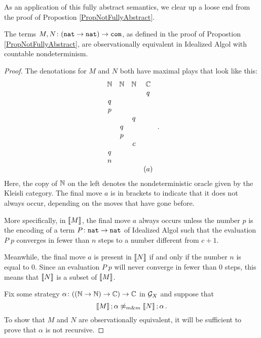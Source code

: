\documentclass[11pt]{report}
\begin{document}
As an application of this fully abstract semantics, we clear up a loose end from the proof of Propostion \ref{PropNotFullyAbstract}.

\begin{lemma}
  The terms $M,N\colon ({\mathtt{nat}} \to {\mathtt{nat}}) \to {\mathtt{com}}$, as defined in the proof of Propostion \ref{PropNotFullyAbstract}, are observationally equivalent in Idealized Algol with countable nondeterminism.
\end{lemma}
\begin{proof}
  The denotations for $M$ and $N$ both have maximal plays that look like this:
  \[
    \begin{array}{cccc}
      \mathbb{N} & \mathbb{N} & \mathbb{N} & \mathbb{C} \\
          &     &     &  q  \\
       q  &     &     &     \\
       p  &     &     &     \\
          &     &  q  &     \\
          &  q  &     &     \\
          &  p  &     &     \\
          &     &  c  &     \\
       q  &     &     &     \\
       n  &     &     &     \\
          &     &     & (a)
    \end{array}\,.
    \]
  Here, the copy of $\mathbb{N}$ on the left denotes the nondeterministic oracle given by the Kleisli category.  
  The final move $a$ is in brackets to indicate that it does not always occur, depending on the moves that have gone before.

  More specifically, in $\left\llbracket M\right\rrbracket$, the final move $a$ always occurs unless the number $p$ is the encoding of a term $P\colon{\mathtt{nat}} \to {\mathtt{nat}}$ of Idealized Algol such that the evaluation $P\;p$ converges in fewer than $n$ steps to a number different from $c+1$.

  Meanwhile, the final move $a$ is present in $\left\llbracket N\right\rrbracket$ if and only if the number $n$ is equal to $0$.
  Since an evaluation $P\;p$ will never converge in fewer than $0$ steps, this means that $\left\llbracket N\right\rrbracket$ is a subset of $\left\llbracket M\right\rrbracket$.

  Fix some strategy $\alpha\colon ((\mathbb{N} \to \mathbb{N})\to\mathbb{C}) \to \mathbb{C}$ in $\mathcal G_X$ and suppose that
  \[
    \left\llbracket M\right\rrbracket;\alpha\not\mathrel{\approx_{m\&m}} \left\llbracket N\right\rrbracket;\alpha\,.
    \]
  To show that $M$ and $N$ are observationally equivalent, it will be sufficient to prove that $\alpha$ is not recursive.


\end{proof}
\end{document}
